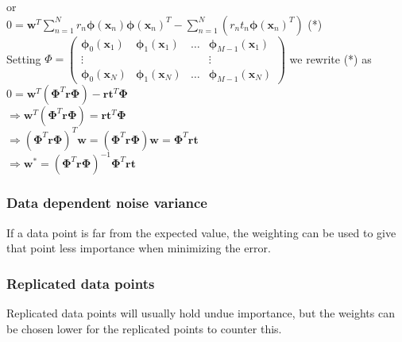 \documentclass{article}
\theoremstyle{dotless}
\newcounter{min}
\begin{document}
or\\

$0=\mathbf{w}^T\sum_{n=1}^Nr_n\mathbf{\phi}(\mathbf{x}_n)\mathbf{\phi}(\mathbf{x}_n)^T-\sum_{n=1}^N(r_nt_n\mathbf{\phi}(\mathbf{x}_n)^T)$ (*)\\

Setting $\Phi=\left(\begin{matrix}\mathbf{\phi}_0(\mathbf{x}_1) & \mathbf{\phi}_1(\mathbf{x}_1) & \dots & \mathbf{\phi}_{M-1}(\mathbf{x}_1) \\
\vdots & & & \vdots \\
\mathbf{\phi}_0(\mathbf{x}_N) & \mathbf{\phi}_1(\mathbf{x}_N) & \dots & \mathbf{\phi}_{M-1}(\mathbf{x}_N)\end{matrix}\right)$ we rewrite (*) as\\

$0=\mathbf{w}^T(\mathbf{\Phi}^T\mathbf{r}\mathbf{\Phi})-\mathbf{r}\mathbf{t}^T\mathbf{\Phi}$\\

$\Rightarrow\mathbf{w}^T(\mathbf{\Phi}^T\mathbf{r}\mathbf{\Phi})=\mathbf{r}\mathbf{t}^T\mathbf{\Phi}$\\

$\Rightarrow(\mathbf{\Phi}^T\mathbf{r}\mathbf{\Phi})^T\mathbf{w}=(\mathbf{\Phi}^T\mathbf{r}\mathbf{\Phi})\mathbf{w}=\mathbf{\Phi}^T\mathbf{r}\mathbf{t}$\\

$\Rightarrow\mathbf{w}^*=(\mathbf{\Phi}^T\mathbf{r}\mathbf{\Phi})^{-1}\mathbf{\Phi}^T\mathbf{r}\mathbf{t}$\\

\subsubsection{Data dependent noise variance}

If a data point is far from the expected value, the weighting can be used to give that point less importance when minimizing the error.

\subsubsection{Replicated data points}

Replicated data points will usually hold undue importance, but the weights can be chosen lower for the replicated points to counter this.


\end{document}
